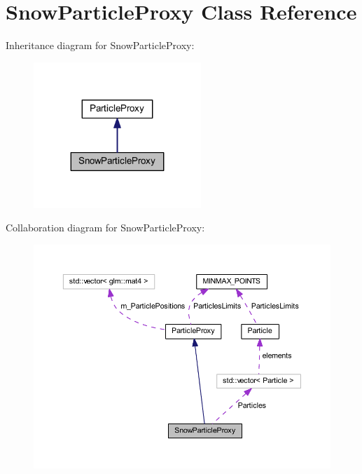 \hypertarget{class_snow_particle_proxy}{}\section{Snow\+Particle\+Proxy Class Reference}
\label{class_snow_particle_proxy}


Inheritance diagram for Snow\+Particle\+Proxy\+:
\nopagebreak
\begin{figure}[H]
\begin{center}
\leavevmode
\includegraphics[width=179pt]{class_snow_particle_proxy__inherit__graph}
\end{center}
\end{figure}


Collaboration diagram for Snow\+Particle\+Proxy\+:
\nopagebreak
\begin{figure}[H]
\begin{center}
\leavevmode
\includegraphics[width=350pt]{class_snow_particle_proxy__coll__graph}
\end{center}
\end{figure}
